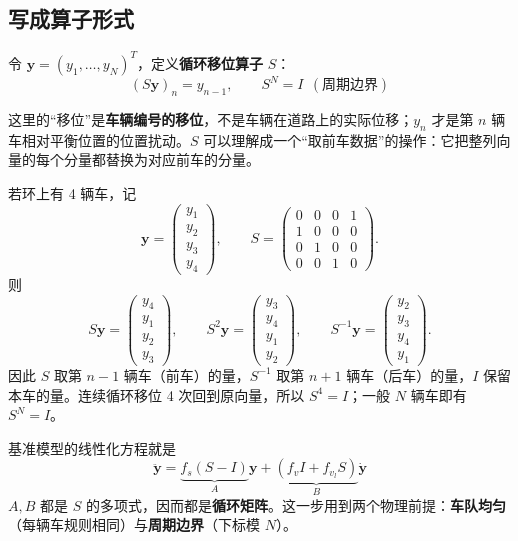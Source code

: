 \documentclass[11pt,a4paper,openany]{book}
\numberwithin{equation}{chapter}
\numberwithin{figure}{chapter}
\numberwithin{table}{chapter}
\begin{document}
\subsection{写成算子形式}

令 $\mathbf y=(y_1,\dots,y_N)^T$，定义\textbf{循环移位算子} $S$：
\begin{equation}
\left(S\mathbf y\right)_n = y_{n-1},
\qquad S^N = I \ \ (\text{周期边界})
\end{equation}

这里的“移位”是\textbf{车辆编号的移位}，不是车辆在道路上的实际位移；$y_n$ 才是第 $n$ 辆车相对平衡位置的位置扰动。$S$ 可以理解成一个“取前车数据”的操作：它把整列向量的每个分量都替换为对应前车的分量。

\begin{tcolorbox}[experimentbox,title=\textbf{用 4 辆车具体看懂移位算子}]
若环上有 4 辆车，记
\[
\mathbf y=
\begin{pmatrix}y_1\\y_2\\y_3\\y_4\end{pmatrix},
\qquad
S=
\begin{pmatrix}
0&0&0&1\\
1&0&0&0\\
0&1&0&0\\
0&0&1&0
\end{pmatrix}.
\]
则
\[
S\mathbf y=
\begin{pmatrix}y_4\\y_1\\y_2\\y_3\end{pmatrix},
\qquad
S^2\mathbf y=
\begin{pmatrix}y_3\\y_4\\y_1\\y_2\end{pmatrix},
\qquad
S^{-1}\mathbf y=
\begin{pmatrix}y_2\\y_3\\y_4\\y_1\end{pmatrix}.
\]
因此 $S$ 取第 $n-1$ 辆车（前车）的量，$S^{-1}$ 取第 $n+1$ 辆车（后车）的量，$I$ 保留本车的量。连续循环移位 4 次回到原向量，所以 $S^4=I$；一般 $N$ 辆车即有 $S^N=I$。
\end{tcolorbox}

基准模型的线性化方程就是
\begin{equation}
\ddot{\mathbf y} = \underbrace{f_s\left(S-I\right)}_{A}\mathbf y + \underbrace{\left(f_vI+f_{v_l}S\right)}_{B}\dot{\mathbf y}
\label{eq:shift-baseline}
\end{equation}
$A,B$ 都是 $S$ 的多项式，因而都是\textbf{循环矩阵}。这一步用到两个物理前提：\textbf{车队均匀}（每辆车规则相同）与\textbf{周期边界}（下标模 $N$）。
\end{document}
